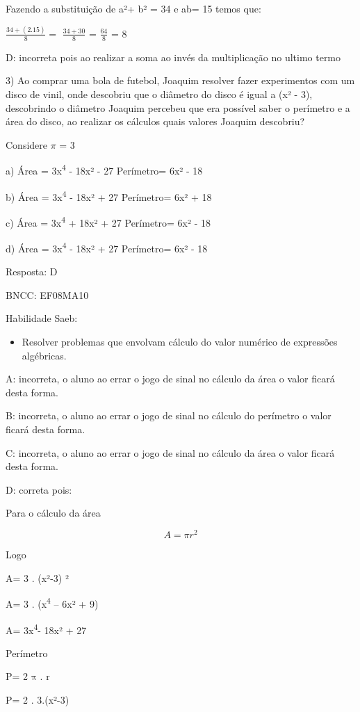 {Fazendo a substituição de a²+ b² = 34 e ab= 15 temos que:

\(\frac{34 + (2.15)}{8} =\) \(\frac{34 + 30}{8}\) = \(\frac{64}{8}\) = 8

D: incorreta pois ao realizar a soma ao invés da multiplicação no ultimo
termo

3) Ao comprar uma bola de futebol, Joaquim resolver fazer experimentos
com um disco de vinil, onde descobriu que o diâmetro do disco é igual a
(x² - 3), descobrindo o diâmetro Joaquim percebeu que era possível saber
o perímetro e a área do disco, ao realizar os cálculos quais valores
Joaquim descobriu?

Considere \(\pi\) = 3

a) Área = 3x\textsuperscript{4} - 18x² - 27 Perímetro= 6x² - 18

b) Área = 3x\textsuperscript{4} - 18x² + 27 Perímetro= 6x² + 18

c) Área = 3x\textsuperscript{4} + 18x² + 27 Perímetro= 6x² - 18

d) Área = 3x\textsuperscript{4} - 18x² + 27 Perímetro= 6x² - 18

Resposta: D

BNCC: EF08MA10

Habilidade Saeb:

\begin{itemize}
\tightlist
\item
  Resolver problemas que envolvam cálculo do valor numérico de
  expressões algébricas.
\end{itemize}

A: incorreta, o aluno ao errar o jogo de sinal no cálculo da área o
valor ficará desta forma.

B: incorreta, o aluno ao errar o jogo de sinal no cálculo do perímetro o
valor ficará desta forma.

C: incorreta, o aluno ao errar o jogo de sinal no cálculo da área o
valor ficará desta forma.

D: correta pois:

Para o cálculo da área

\[A = \pi r^{2}\]

Logo

A= 3 . (x²-3) ²

A= 3 . (x\textsuperscript{4} -- 6x² + 9)

A= 3x\textsuperscript{4}- 18x² + 27

Perímetro

P= 2\(\text{\ π\ .\ r}\)

P= 2 . 3.(x²-3)

}
